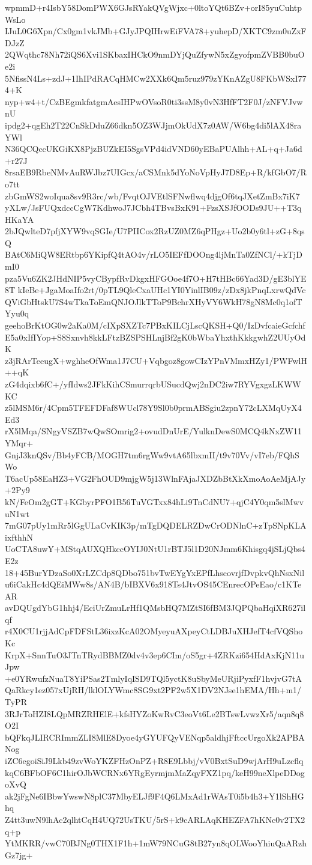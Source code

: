 wpmmD+r4IsbY58DomPWX6GJsRYakQVgWjxc+0ltoYQt6BZv+orI85yuCuhtpWsLo
IJuL0G6Xpn/Cx0gm1vkJMb+GJyJPQIHrwEiFVA78+yuhepD/XKTC9zm0uZxFDJzZ
2QWqthc78Nh72iQS6Xvi1SKbaxIHCkO9nmDYjQuZfywN5xZgyofpmZVBB0buOe2i
5NfissN4Ls+zdJ+1IhIPdRACqHMCw2XXk6Qm5ruz979zYKnAZgU8FKbWSxI774+K
nyp+w4+t/CzBEgmkfatgmAesIHPwOVsoR0ti3ssM8y0vN3HfFT2F0J/zNFVJvwnU
ipdg2+qgEh2T22CnSkDduZ66dkn5OZ3WJjmOkUdX7z0AW/W6bg4di5lAX48raYWl
N36QCQccUKGiKX8PjzBUZkEI5SgsVPd4idVND60yEBaPUAlhh+AL+q+Ja6d+r27J
8rsaEB9RbeNMvAuRWJbz7UIGcx/aCSMnk5dYoNoVpHyJ7D8Ep+R/kfGbO7/Ro7tt
zbGmWS2woIqua8sv9R3rc/wb/FvqtOJVEtlSFNwflwq4djgOf6tqJXetZmBx7iK7
yXLw/JsFUQxdccCgW7KdhwoJ7JCbh4TBvsBxK91+FzsXSJfOODs9JU++T3qHKaYA
2bJQwlteD7pfjXYW9vqSGIe/U7PIICox2RzUZ0MZ6qPHgz+Uo2b0y6tl+zG+8qsQ
BAtC6MiQW8ERtbp6YKipfQ4tAO4v/rLO5IEFfDOOng4ljMnTa0ZfNCl/+kTjDmI0
pza5Vu6ZK2JHdNIP5vyCBypfRvDkgxHFGOoe4f7O+H7tHBc66Yad3D/gE3blYE8T
kIeBe+JgaMoaIfo2rt/0pTL9QleCxaUHc1YI0YinlIB09z/zDx8jkPnqLxrwQdVc
QViGbHtskU7S4wTkaToEmQNJOJlkTToP9BchrXHyVY6WkH78gN8Mc0q1ofTYyu0q
geehoBrKtOG0w2aKa0M/cIXpSXZTc7PBxKILCjLscQKSH+Q0/IzDvfcaieGcfchf
E5a0xIfIYop+S8Sxnvh8kkLFtzBZSPSHLnjBf2gK0bWbaYhxthKkkgwhZ2UUyOdK
z3jRArTeeugX+wghheOfWma1J7CU+Vqbgoz8gowCIzYPnVMmxHZy1/PWFwlH++qK
zG4dqixb6fC+/yfIdws2JFkKihCSmurrqrbUSucdQwj2nDC2iw7RYVgxgzLKWWKC
z5lMSM6r/4Cpm5TFEFDFaf8WUcl78Y9Sl0b0prmABSgiu2zpnY72cLXMqUyX4Ed3
rX5lMqa/SNgyVSZB7wQwSOmrig2+ovudDnUrE/YulknDewS0MCQ4kNxZW11YMqr+
GnjJ3knQSv/Bb4yFCB/MOGH7tm6rgWw9vtA65lbxmII/t9v70Vv/vI7eb/FQhSWo
T6acUp58EaHZ3+VG2FhOUD9mjgW5j13WlnFAjaJXDZbBtXkXmoAoAeMjAJy+2Py9
kN/FeOm2gGT+KGbyrPFO1B56TuVGTxx84hLi9TnCdNU7+qjC4Y0qm5slMwvuN1wt
7mG07pUy1mRr5lGgULaCvKIK3p/mTgDQDELRZDwCrODNlnC+zTpSNpKLAixfthhN
UoCTA8uwY+MStqAUXQHkccOYIJ0NtU1rBTJ5l1D20NJmm6Khisgq4jSLjQbs4E2z
18+45BurYDzaSo0XrLZCdp8QDbo751bvTwEYgYxEPfLhscovrjfDvpkvQhNsxNil
u6iCakHc4dQEiMWw8s/AN4B/bIBXV6x918Ts4JtvOS45CEnrecOPeEao/c1KTeAR
avDQUgdYbG1hhj4/EciUrZmuLrHf1QMsbHQ7MZtSI6fBM3JQPQbaHqiXR627ilqf
r4X0CU1rjjAdCpFDFStL36ixzKcA02OMyeyuAXpeyCtLDBJuXHJefT4cfVQShoKc
KrpX+SnnTuO3JTnTRydBBMZ0dv4v3ep6CIm/oS5gr+4ZRKzi654HdAxKjN11uJpw
+e0YRwufzNuaT8YiPSas2TmlyIqISD9TQl5yctK8uSbyMeURjiPyxfF1hvjvG7tA
QaRkcy1ez057xUjRH/lklOLYWmc8SG9xt2PF2w5X1DV2NJse1hEMA/Hh+m1/TyPR
3RJrToHZI8LQpMRZRHElE+kfsHYZoKwRvC3eoVt6Le2BTswLvwzXr5/aqn8q8O2I
bQFkqJLIRCRImmZLI8MlE8Dyoe4yGYUFQyVENqp5aldhjFftccUrgoXk2APBANog
iZC6egoiSiJ9Lkb49zvWoYKZFHzOnPZ+R8E9Lbbj/vV0BxtSuD9wjArH9uLzcflq
kqC6BFbOF6C1hirOJbWCRNx6YRgEyrmjmMaZqyFXZ1pq/keH99neXlpeDDogoXvQ
ak2jFgNe6IBbwYwswN8plC37MbyELJf9F4Q6LMxAd1rWAsT0i5b4h3+Y1lShHGhq
Z4tt3uwN9lhAc2qlhtCqH4UQ72UsTKU/5rS+k9cARLAqKHEZFA7hKNc0v2TX2q+p
YtMKRR/vwC70BJNg0THX1F1h+1mW79NCuG8tB27yn8qOLWooYhiuQaARzhGz7jg+
